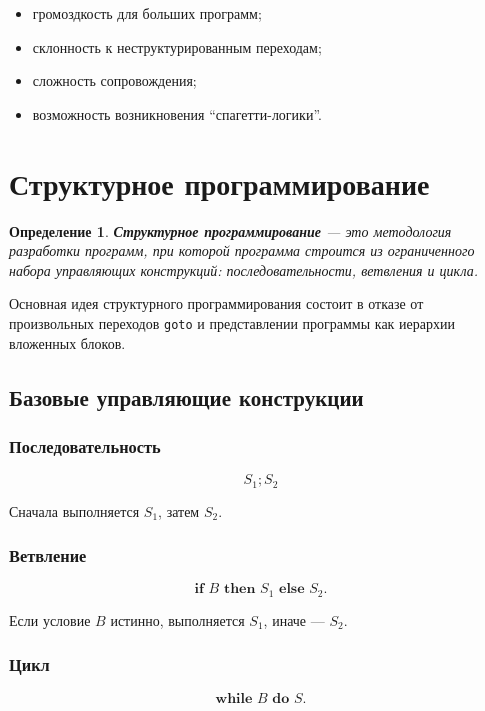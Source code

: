 \documentclass[12pt,a4paper]{article}
\newtheorem{definition}{Определение}
\begin{document}
\begin{itemize}
    \item громоздкость для больших программ;
    \item склонность к неструктурированным переходам;
    \item сложность сопровождения;
    \item возможность возникновения ``спагетти-логики''.
\end{itemize}

\section{Структурное программирование}

\begin{definition}
\textbf{Структурное программирование} --- это методология разработки программ, при которой программа строится из ограниченного набора управляющих конструкций: последовательности, ветвления и цикла.
\end{definition}

Основная идея структурного программирования состоит в отказе от произвольных переходов \texttt{goto} и представлении программы как иерархии вложенных блоков.

\subsection{Базовые управляющие конструкции}

\subsubsection{Последовательность}

\[
    S_1; S_2
\]

Сначала выполняется $S_1$, затем $S_2$.

\subsubsection{Ветвление}

\[
    \textbf{if } B \textbf{ then } S_1 \textbf{ else } S_2.
\]

Если условие $B$ истинно, выполняется $S_1$, иначе --- $S_2$.

\subsubsection{Цикл}

\[
    \textbf{while } B \textbf{ do } S.
\]
\end{document}
